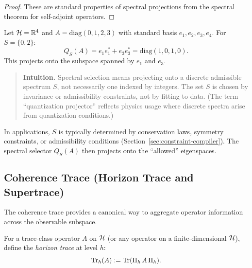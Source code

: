 \begin{proof}
These are standard properties of spectral projections from the spectral theorem for self-adjoint operators.
\end{proof}

\begin{example}
\label{ex:finite-quantization}
Let $\mathcal{H} = \mathbb{R}^4$ and $A = \mathrm{diag}(0, 1, 2, 3)$ with standard basis $e_1, e_2, e_3, e_4$.
For $S = \{0, 2\}$:
\[
Q_S(A) = e_1 e_1^* + e_3 e_3^* = \mathrm{diag}(1, 0, 1, 0).
\]
This projects onto the subspace spanned by $e_1$ and $e_3$.
\end{example}

\begin{quote}\small
\textbf{Intuition.}
Spectral selection means projecting onto a discrete admissible spectrum $S$,
not necessarily one indexed by integers.
The set $S$ is chosen by invariance or admissibility constraints, not by fitting to data.
(The term ``quantization projector'' reflects physics usage where discrete spectra arise from quantization conditions.)
\end{quote}

\begin{remark}
In applications, $S$ is typically determined by conservation laws, symmetry constraints, or admissibility conditions (Section~\ref{sec:constraint-compiler}).
The spectral selector $Q_S(A)$ then projects onto the ``allowed'' eigenspaces.
\end{remark}

\subsection{Coherence Trace (Horizon Trace and Supertrace)}
\label{subsec:coherence-trace}

The coherence trace provides a canonical way to aggregate operator information across the observable subspace.

\begin{definition}
\label{def:horizon-trace}
For a trace-class operator $A$ on $\mathcal{H}$ (or any operator on a finite-dimensional $\mathcal{H}$), define the \emph{horizon trace} at level $h$:
\[
\mathrm{Tr}_{h}(A) := \mathrm{Tr}(\Pi_{h}\, A \,\Pi_{h}).
\]
\end{definition}

